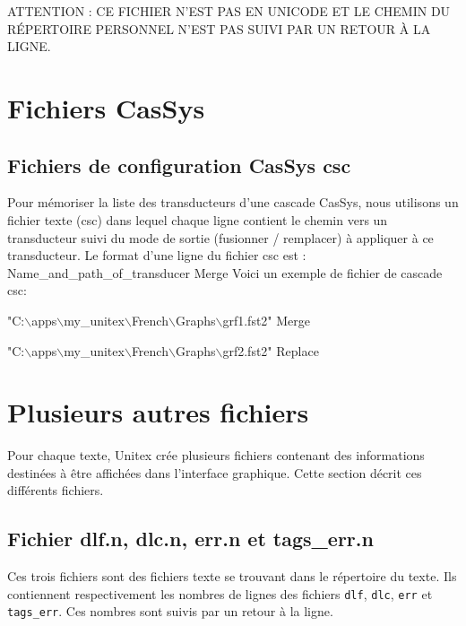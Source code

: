 \bigskip
\noindent ATTENTION : CE FICHIER N’EST PAS EN UNICODE ET LE CHEMIN DU RÉPERTOIRE PERSONNEL N’EST PAS
SUIVI PAR UN RETOUR À LA LIGNE.


\section{Fichiers CasSys}

\subsection{Fichiers de  configuration CasSys csc}

Pour mémoriser la liste des transducteurs d'une cascade CasSys, nous utilisons un fichier texte
(csc) dans lequel chaque ligne contient le chemin vers un transducteur suivi du mode de sortie
(fusionner / remplacer) à appliquer à ce transducteur.
Le format d'une ligne du fichier csc est : Name\_and\_path\_of\_transducer  Merge
Voici un exemple de fichier de cascade csc:

\ttfamily
"C:$\backslash$apps$\backslash$my\_unitex$\backslash$French$\backslash$Graphs$\backslash$grf1.fst2" Merge

"C:$\backslash$apps$\backslash$my\_unitex$\backslash$French$\backslash$Graphs$\backslash$grf2.fst2" Replace
\rmfamily

\section{Plusieurs autres fichiers}
Pour chaque texte, Unitex crée plusieurs fichiers contenant des informations destinées à être
affichées dans l’interface graphique. Cette section décrit ces différents fichiers.



\subsection{Fichier dlf.n, dlc.n, err.n et tags\_err.n}
Ces trois fichiers sont des fichiers texte se trouvant dans le répertoire du texte. Ils contiennent
respectivement les nombres de lignes des fichiers \verb+dlf+, \verb+dlc+, \verb+err+ et
\verb+tags_err+. Ces nombres sont suivis par un retour à la ligne.



